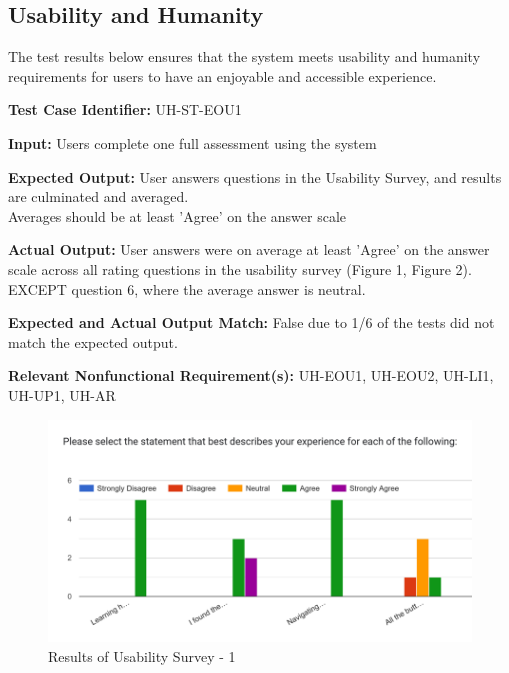 \documentclass[12pt, titlepage]{article}
\begin{document}
\newpage{}

\subsection{Usability and Humanity}
\hspace{2em}The test results below ensures that the system meets usability and humanity
requirements for users to have an enjoyable and accessible experience.

\begin{mdframed}[linewidth=0.5mm] \par
  \textbf{Test Case Identifier:} UH-ST-EOU1 \par
  \textbf{Input:} Users complete one full assessment using the system \par
  \textbf{Expected Output:} User answers questions in the Usability Survey, and results are culminated and averaged.\\
  Averages should be at least 'Agree' on the answer scale \par
  \textbf{Actual Output:} User answers were on average at least 'Agree' on the answer scale across all rating questions in the usability survey (Figure 1, Figure 2). 
  EXCEPT question 6, where the average answer is neutral. \par
  \textbf{Expected and Actual Output Match:} False due to 1/6 of the tests did not match the expected output. \par
  \textbf{Relevant Nonfunctional Requirement(s):} UH-EOU1, UH-EOU2, UH-LI1, UH-UP1, UH-AR
\end{mdframed}

\begin{figure}[h]
  \centering
  \includegraphics[width=1\textwidth]{images/UsabilityTestResults_pt1.png}
  \caption{Results of Usability Survey - 1}
\end{figure}
\end{document}
